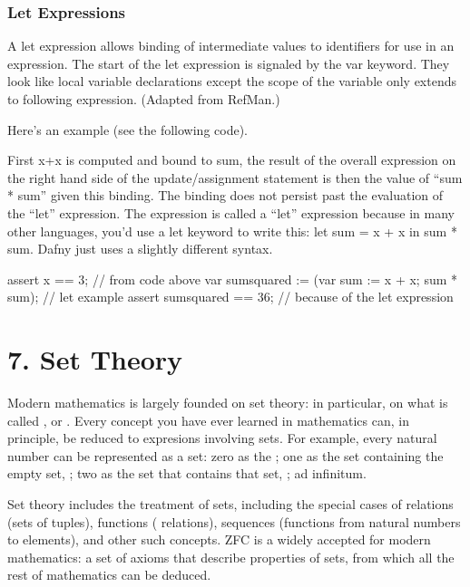 \documentclass[letterpaper,10pt,english]{sphinxmanual}
\begin{document}
\subsection{Let Expressions}
\label{\detokenize{06-dafny-language:let-expressions}}
A let expression allows binding of intermediate values to identifiers
for use in an expression. The start of the let expression is signaled
by the var keyword. They look like local variable declarations except
the scope of the variable only extends to following
expression. (Adapted from RefMan.)

Here’s an example (see the following code).

First x+x is computed and bound to sum, the result of the overall
expression on the right hand side of the update/assignment statement
is then the value of “sum * sum” given this binding. The binding does
not persist past the evaluation of the “let” expression.  The
expression is called a “let” expression because in many other
languages, you’d use a let keyword to write this: let sum = x + x in
sum * sum. Dafny just uses a slightly different syntax.

\begin{sphinxVerbatim}[commandchars=\\\{\}]
assert x == 3;               // from code above
var sumsquared := (var sum := x + x; sum * sum);  // let example
assert sumsquared == 36;     // because of the let expression
\end{sphinxVerbatim}


\chapter{7. Set Theory}
\label{\detokenize{07-set-theory::doc}}\label{\detokenize{07-set-theory:set-theory}}
Modern mathematics is largely founded on set theory: in particular, on
what is called ,
or . Every concept you have ever learned in mathematics can, in
principle, be reduced to expresions involving sets.  For example,
every natural number can be represented as a set: zero as the ; one as the set containing the empty set, \sphinxstyleemphasis{\{\{\}\}}; two as the
set that contains that set, \sphinxstyleemphasis{\{\{\{\}\}\}}; ad infinitum.

Set theory includes the treatment of sets, including the special cases
of relations (sets of tuples), functions ( relations),
sequences (functions from natural numbers to elements), and other such
concepts.  ZFC is a widely accepted  for modern
mathematics: a set of axioms that describe properties of sets, from
which all the rest of mathematics can be deduced.
\end{document}
